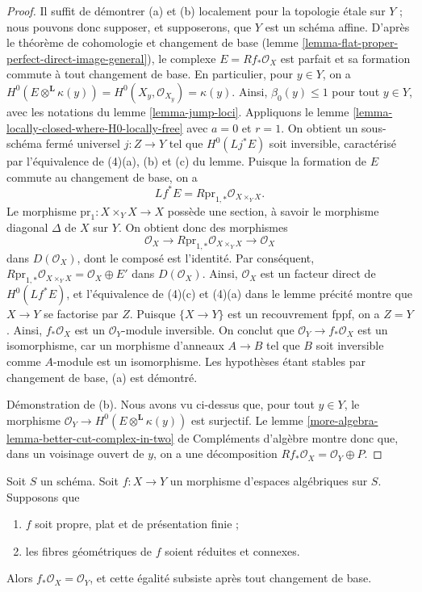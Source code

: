 \begin{proof}
Il suffit de d\'emontrer (a) et (b) localement pour la topologie \'etale sur
$Y$ ; nous pouvons donc supposer, et supposerons, que $Y$ est un sch\'ema
affine. D'apr\`es le th\'eor\`eme de cohomologie et changement de base
(lemme \ref{lemma-flat-proper-perfect-direct-image-general}), le complexe
$E=Rf_*\mathcal{O}_X$ est parfait et sa formation commute \`a tout changement
de base. En particulier, pour $y\in Y$, on a
$H^0(E\otimes^\mathbf{L}\kappa(y))=
H^0(X_y,\mathcal{O}_{X_y})=\kappa(y)$.
Ainsi, $\beta_0(y)\leq1$ pour tout $y\in Y$, avec les notations du lemme
\ref{lemma-jump-loci}. Appliquons le lemme
\ref{lemma-locally-closed-where-H0-locally-free} avec $a=0$ et $r=1$.
On obtient un sous-sch\'ema ferm\'e universel $j:Z\to Y$ tel que
$H^0(Lj^*E)$ soit inversible, caract\'eris\'e par l'\'equivalence de (4)(a),
(b) et (c) du lemme. Puisque la formation de $E$ commute au changement de
base, on a
$$
Lf^*E = R\text{pr}_{1, *}\mathcal{O}_{X \times_Y X}.
$$
Le morphisme $\text{pr}_1:X\times_YX\to X$ poss\`ede une section, \`a savoir le
morphisme diagonal $\Delta$ de $X$ sur $Y$. On obtient donc des morphismes
$$
\mathcal{O}_X \longrightarrow R\text{pr}_{1, *}\mathcal{O}_{X \times_Y X}
\longrightarrow \mathcal{O}_X
$$
dans $D(\mathcal{O}_X)$, dont le compos\'e est l'identit\'e. Par cons\'equent,
$R\text{pr}_{1,*}\mathcal{O}_{X\times_YX}=\mathcal{O}_X\oplus E'$ dans
$D(\mathcal{O}_X)$. Ainsi, $\mathcal{O}_X$ est un facteur direct de
$H^0(Lf^*E)$, et l'\'equivalence de (4)(c) et (4)(a) dans le lemme pr\'ecit\'e
montre que $X\to Y$ se factorise par $Z$. Puisque $\{X\to Y\}$ est un
recouvrement fppf, on a $Z=Y$. Ainsi, $f_*\mathcal{O}_X$ est un
$\mathcal{O}_Y$-module inversible. On conclut que
$\mathcal{O}_Y\to f_*\mathcal{O}_X$ est un isomorphisme, car un morphisme
d'anneaux $A\to B$ tel que $B$ soit inversible comme $A$-module est un
isomorphisme. Les hypoth\`eses \'etant stables par changement de base, (a) est
d\'emontr\'e.

\medskip\noindent
D\'emonstration de (b). Nous avons vu ci-dessus que, pour tout $y\in Y$, le
morphisme $\mathcal{O}_Y\to H^0(E\otimes^\mathbf{L}\kappa(y))$ est surjectif.
Le lemme \ref{more-algebra-lemma-better-cut-complex-in-two} de Compl\'ements
d'alg\`ebre montre donc que, dans un voisinage ouvert de $y$, on a une
d\'ecomposition $Rf_*\mathcal{O}_X=\mathcal{O}_Y\oplus P$.
\end{proof}

\begin{lemma}
\label{lemma-proper-flat-geom-red-connected}
Soit $S$ un sch\'ema.
Soit $f:X\to Y$ un morphisme d'espaces alg\'ebriques sur $S$. Supposons que
\begin{enumerate}
\item $f$ soit propre, plat et de pr\'esentation finie ;
\item les fibres g\'eom\'etriques de $f$ soient r\'eduites et connexes.
\end{enumerate}
Alors $f_*\mathcal{O}_X=\mathcal{O}_Y$, et cette \'egalit\'e subsiste apr\`es
tout changement de base.
\end{lemma}

